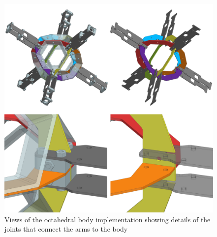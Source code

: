 \documentclass[conference]{IEEEtran}
\begin{document}
\begin{figure}
	\includegraphics[width=\columnwidth]{img/1_geometry_cad.png}
	\centering
	\caption{Views of the octahedral body implementation showing details of the joints that connect the arms to the body}
	\label{fig:1_geometry_cad}
	\vspace{6pt}
\end{figure}

\end{document}
